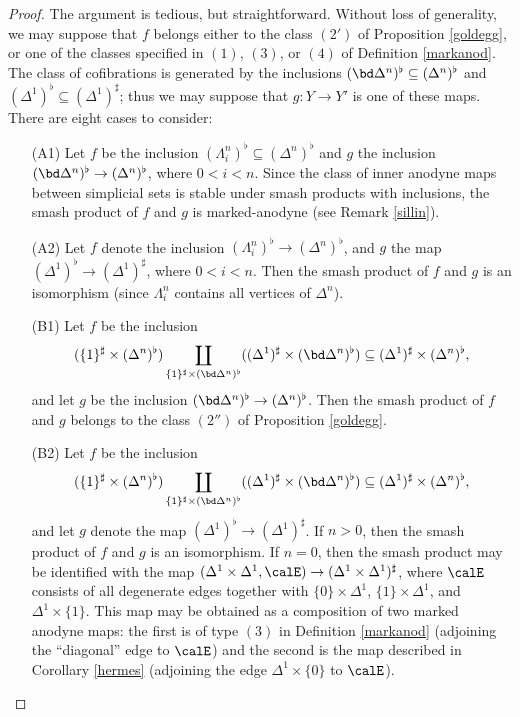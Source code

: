 \begin{proof}
The argument is tedious, but straightforward. 
Without loss of generality, we may suppose that $f$ belongs either to the class $(2')$ of
Proposition \ref{goldegg}, or one of the classes specified in $(1)$, $(3)$, or $(4)$ of Definition \ref{markanod}.
The class of cofibrations is generated by the inclusions $(\bd \Delta^n)^{\flat} \subseteq (\Delta^n)^{\flat}$ and $(\Delta^1)^{\flat} \subseteq (\Delta^1)^{\sharp}$; thus we may suppose that $g: Y \rightarrow Y'$ is one of these maps. There are eight cases to consider:

\begin{itemize}
\item[(A1)] Let $f$ be the inclusion $(\Lambda^n_i)^{\flat} \subseteq (\Delta^n)^{\flat}$ and $g$ the inclusion $(\bd \Delta^n)^{\flat} \rightarrow (\Delta^n)^{\flat}$, where $0 < i < n$. Since the class of inner anodyne maps between simplicial sets is stable under smash products with inclusions, the smash product of $f$ and $g$ is marked-anodyne (see Remark \ref{sillin}). 

\item[(A2)] Let $f$ denote the inclusion $(\Lambda^n_i)^{\flat} \rightarrow (\Delta^n)^{\flat}$, and $g$ the map $(\Delta^1)^{\flat} \rightarrow (\Delta^1)^{\sharp}$, where $0 < i < n$. Then the smash product of $f$ and $g$ is an isomorphism (since $\Lambda^n_i$ contains all vertices of $\Delta^n$).

\item[(B1)] Let $f$ be the inclusion $$(\{ 1\}^{\sharp} \times (\Delta^n)^{\flat} ) \coprod_{ \{1\}^{\sharp} \times (\bd \Delta^n)^{\flat} } ((\Delta^1)^{\sharp} \times (\bd \Delta^n)^{\flat} ) \subseteq (\Delta^1)^{\sharp} \times (\Delta^n)^{\flat},$$ and let $g$ be the inclusion $(\bd \Delta^n)^{\flat} \rightarrow (\Delta^n)^{\flat}$. Then the smash product of $f$ and $g$ belongs to the class $(2'')$ of Proposition \ref{goldegg}.

\item[(B2)] Let $f$ be the inclusion $$(\{ 1\}^{\sharp} \times (\Delta^n)^{\flat} ) \coprod_{ \{1\}^{\sharp} \times (\bd \Delta^n)^{\flat} } ((\Delta^1)^{\sharp} \times (\bd \Delta^n)^{\flat} ) \subseteq (\Delta^1)^{\sharp} \times (\Delta^n)^{\flat},$$ and let $g$ denote the map
$(\Delta^1)^{\flat} \rightarrow (\Delta^1)^{\sharp}$. If $n > 0$, then the smash product of $f$ and $g$ is an isomorphism. If $n = 0$, then the smash product may be identified with
the map $ (\Delta^1 \times \Delta^1, \calE) \rightarrow (\Delta^1 \times \Delta^1)^{\sharp}$, where $\calE$ consists of all degenerate edges together with $\{0\} \times \Delta^1$, $\{1\} \times \Delta^1$, and $\Delta^1 \times \{1\}$. This map may be obtained as a composition of
two marked anodyne maps: the first is of type $(3)$ in Definition \ref{markanod} (adjoining the ``diagonal'' edge to $\calE$) and the second is the map described in Corollary \ref{hermes}
(adjoining the edge $\Delta^1 \times \{0\}$ to $\calE$).


\end{itemize}
\end{proof}

